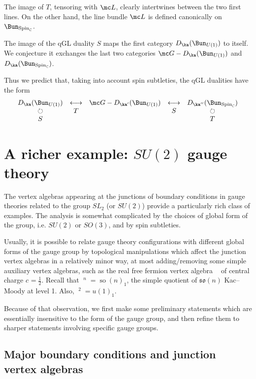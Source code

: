 \documentclass[11pt,reqno]{amsart}
\theoremstyle{plain}
\numberwithin{equation}{section}
\newcommand{\R}{\mathbb{R}}
\newcommand{\C}{\mathbb{C}}
\DeclareMathOperator{\tso}{so}
\DeclareMathOperator{\Ff}{\bigwedge_{\R}}
\theoremstyle{definition}
\begin{document}
\medskip

The image of $T$, tensoring with ${\mc L}$, clearly intertwines
between the two first lines. On the other hand, the line bundle ${\mc
  L}$ is defined canonically on $\Bun_{\mathrm{Spin}_\C}$.

The image of the qGL duality $S$ maps the first category
$D_{\ka}(\Bun_{U(1)})$ to itself. We conjecture it exchanges the last
two categories ${\mc G}-D_{\ka}(\Bun_{U(1)})$ and
$D_{\ka}(\Bun_{\mathrm{Spin}_\C})$.

Thus we predict that, taking into account spin subtleties, the qGL
dualities have the form
\begin{equation}
\begin{matrix} D_{\ka}(\Bun_{U(1)}) & \longleftrightarrow & {\mc
    G}-D_{\ka'}(\Bun_{U(1)}) & \longleftrightarrow &
  D_{\ka''}(\Bun_{\mathrm{Spin}_\C}) \cr \circlearrowright & T
  &&S&\circlearrowright
\cr S & &&& T\end{matrix}
\end{equation}

\section{A richer example: $SU(2)$ gauge theory}    \label{SU2}

The vertex algebras appearing at the junctions of boundary conditions
in gauge theories related to the group $SL_2$ (or $SU(2)$) provide a
particularly rich class of examples. The analysis is somewhat
complicated by the choices of global form of the group, i.e. $SU(2)$
or $SO(3)$, and by spin subtleties.

Usually, it is possible to relate gauge theory configurations with
different global forms of the gauge group by topological manipulations
which affect the junction vertex algebras in a relatively minor way,
at most adding/removing some simple auxiliary vertex algebras, such as
the real free fermion vertex algebra $\Ff$ of central charge
$c_{\Ff}=\frac12$. Recall that $\Ff^n = \tso(n)_1$, the simple
quotient of $\mathfrak{so}(n)$ Kac--Moody at level 1. Also, $\Ff^2 =
u(1)_1$.

Because of that observation, we first make some preliminary statements
which are essentially insensitive to the form of the gauge group, and
then refine them to sharper statements involving specific gauge
groups.

\subsection{Major boundary conditions and junction vertex algebras}
\end{document}
